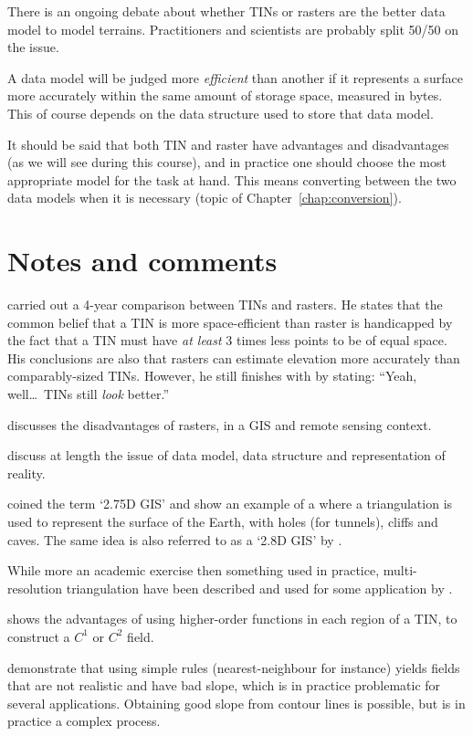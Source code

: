 There is an ongoing debate about whether TINs or rasters are the better data model to model terrains.
Practitioners and scientists are probably split 50/50 on the issue.

A data model will be judged more \emph{efficient} than another if it represents a surface more accurately within the same amount of storage space, measured in bytes.
This of course depends on the data structure used to store that data model.

It should be said that both TIN and raster have advantages and disadvantages (as we will see during this course), and in practice one should choose the most appropriate model for the task at hand.
This means converting between the two data models when it is necessary (topic of Chapter~\ref{chap:conversion}).


%
\section{Notes and comments}

\citet{Kumler94} carried out a 4-year comparison between TINs and rasters.
He states that the common belief that a TIN is more space-efficient than raster is handicapped by the fact that a TIN must have \emph{at least} 3 times less points to be of equal space.
His conclusions are also that rasters can estimate elevation more accurately than comparably-sized TINs.
However, he still finishes with by stating: ``Yeah, well\ldots\ TINs still \emph{look} better.'' 

\citet{Fisher97} discusses the disadvantages of rasters, in a GIS and remote sensing context.

\citet{Frank92,Goodchild92a} discuss at length the issue of data model, data structure and representation of reality. 

\citet{Tse04} coined the term `2.75D GIS' and show an example of a where a triangulation is used to represent the surface of the Earth, with holes (for tunnels), cliffs and caves. 
The same idea is also referred to as a `2.8D GIS' by \citet{Groger05}.

While more an academic exercise then something used in practice, multi-resolution triangulation have been described and used for some application by \citet{DeFloriani02}.

\citet{Akima78} shows the advantages of using higher-order functions in each region of a TIN, to construct a $C^1$ or $C^2$ field. 

\citet{Dakowicz03} demonstrate that using simple rules (nearest-neighbour for instance) yields fields that are not realistic and have bad slope, which is in practice problematic for several applications.
Obtaining good slope from contour lines is possible, but is in practice a complex process.


